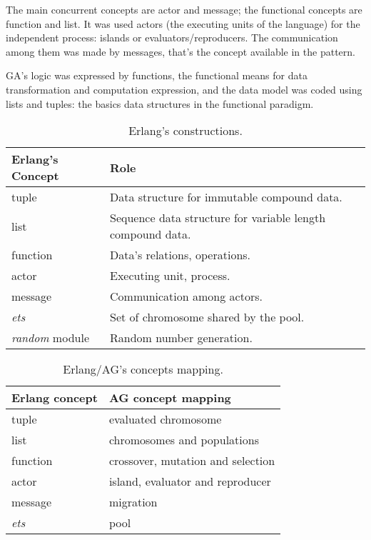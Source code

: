 
The main concurrent concepts are actor and message; the functional concepts are function and list. It was used actors (the executing units of the language) for the independent process: islands or evaluators/reproducers. The communication among them was made by messages, that’s the concept available in the pattern.

GA’s logic was expressed by functions, the functional means for data transformation and computation expression, and the data model was coded using lists and tuples: the basics data structures in the functional paradigm.


\begin{table}[h!]
  \centering
   \caption{Erlang's constructions.}\label{erlConstructions}
\begin{tabular}{|>{\centering}p{3.4cm}|p{7cm}|}
  \hline
  \textbf{Erlang's Concept} & \textbf{Role} \tabularnewline
     \hline
  tuple & Data structure for immutable compound data. \tabularnewline
     \hline
  list & Sequence data structure for variable length compound data. \tabularnewline
     \hline
  function & Data's relations, operations. \tabularnewline
     \hline
  actor & Executing unit, process. \tabularnewline
     \hline
  message & Communication among actors. \tabularnewline
     \hline
  {\em ets} & Set of chromosome shared by the pool. \tabularnewline
     \hline
  {\em random} module& Random number generation. \tabularnewline
  \hline
\end{tabular}

\end{table}

\begin{table}
  \centering
  \caption{Erlang/AG's concepts mapping.}\label{erlAGRelation}
\begin{tabular}{|>{\centering}p{3cm}|p{6cm}|}
  \hline
  \textbf{Erlang concept} & \textbf{AG concept mapping} \tabularnewline
     \hline
  tuple & evaluated chromosome \tabularnewline
     \hline
  list & chromosomes and populations \tabularnewline
     \hline
  function & crossover, mutation and selection \tabularnewline
     \hline
  actor  & island, evaluator and reproducer \tabularnewline
     \hline
  message & migration \tabularnewline
     \hline
  {\em ets}  & pool \tabularnewline
     \hline

\end{tabular}

\end{table}


